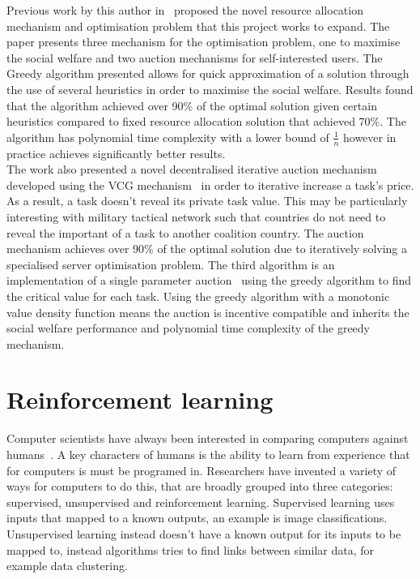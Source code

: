 Previous work by this author in~\cite{FlexibleResourceAllocation} proposed the novel resource allocation mechanism and
optimisation problem that this project works to expand. The paper presents three mechanism for the optimisation problem,
one to maximise the social welfare and two auction mechanisms for self-interested users. The Greedy algorithm presented
allows for quick approximation of a solution through the use of several heuristics in order to maximise the social
welfare. Results found that the algorithm achieved over 90\% of the optimal solution given certain heuristics compared
to fixed resource allocation solution that achieved 70\%. The algorithm has polynomial time complexity with a lower
bound of $\frac{1}{n}$ however in practice achieves significantly better results. \\
The work also presented a novel decentralised iterative auction mechanism developed using the VCG
mechanism~\citep{vickrey, Clarke, groves} in order to iterative increase a task's price. As a result, a task doesn't
reveal its private task value. This may be particularly interesting with military tactical network such that countries
do not need to reveal the important of a task to another coalition country. The auction mechanism achieves over 90\% of
the optimal solution due to iteratively solving a specialised server optimisation problem. The third algorithm is an
implementation of a single parameter auction~\citep{nisan2007algorithmic_critical_value} using the greedy algorithm to
find the critical value for each task. Using the greedy algorithm with a monotonic value density function means the
auction is incentive compatible and inherits the social welfare performance and polynomial time complexity of the
greedy mechanism.

\section{Reinforcement learning}\label{sec:reinforcement-learning}
Computer scientists have always been interested in comparing computers against humans~\citep{turing1950computing}. A
key characters of humans is the ability to learn from experience that for computers is must be programed in. Researchers
have invented a variety of ways for computers to do this, that are broadly grouped into three categories:
supervised, unsupervised and reinforcement learning. Supervised learning uses inputs that mapped to a known outputs, an
example is image classifications. Unsupervised learning instead doesn't have a known output for its inputs to be mapped
to, instead algorithms tries to find links between similar data, for example data clustering.

